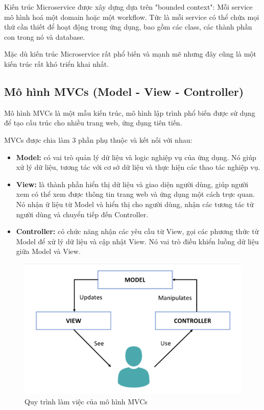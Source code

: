 Kiến trúc Microservice được xây dựng dựa trên "bounded context": Mỗi service mô hình hoá một domain hoặc một workflow. Tức là mỗi service có thể chứa mọi thứ cần thiết để hoạt động trong ứng dụng, bao gồm các class, các thành phần con trong nó và database.

Mặc dù kiến trúc Microservice rất phổ biến và mạnh mẽ nhưng đây cũng là một kiến trúc rất khó triển khai nhất. 

\subsection{Mô hình MVCs (Model - View - Controller)}

Mô hình MVCs là một mẫu kiến trúc, mô hình lập trình phổ biến được sử dụng để tạo cấu trúc cho nhiều trang web, ứng dụng tiên tiến.

MVCs được chia làm 3 phần phụ thuộc và kết nối với nhau:
\begin{itemize}
    \item \textbf{Model:} có vai trò quản lý dữ liệu và logic nghiệp vụ của ứng dụng. Nó giúp xử lý dữ liệu, tương tác với cơ sở dữ liệu và thực hiện các thao tác nghiệp vụ.
    \item \textbf{View:} là thành phần hiển thị dữ liệu và giao diện người dùng, giúp người xem có thể xem được thông tin trang web và ứng dụng một cách trực quan. Nó nhận ữ liệu từ Model và hiển thị cho người dùng, nhận các tương tác từ người dùng và chuyển tiếp đến Controller.
    \item \textbf{Controller:} có chức năng nhận các yêu cầu từ View, gọi các phương thức từ Model để xử lý dữ liệu và cập nhật View. Nó vai trò điều khiển luồng dữ liệu giữa Model và View.
\end{itemize}

\begin{figure}[H]

	\centering
    \includegraphics[scale=0.4]{img/MVCs_workflow.png}
    \caption{Quy trình làm việc của mô hình MVCs}
\end{figure}

